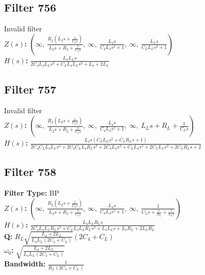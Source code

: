 \documentclass{article}
\begin{document}
\subsection*{Filter 756}
Invalid filter \\ 
\textbf{$Z(s)$:} $\left( \infty, \  \frac{R_{2} \left(L_{2} s + \frac{1}{C_{2} s}\right)}{L_{2} s + R_{2} + \frac{1}{C_{2} s}}, \  \infty, \  \frac{L_{4} s}{C_{4} L_{4} s^{2} + 1}, \  \infty, \  \frac{L_{L} s}{C_{L} L_{L} s^{2} + 1}\right)$ \\ 
\textbf{$H(s)$:} $\frac{L_{4} L_{L} s}{2 C_{4} L_{4} L_{L} s^{2} + C_{L} L_{4} L_{L} s^{2} + L_{4} + 2 L_{L}}$ \\ 
\subsection*{Filter 757}
Invalid filter \\ 
\textbf{$Z(s)$:} $\left( \infty, \  \frac{R_{2} \left(L_{2} s + \frac{1}{C_{2} s}\right)}{L_{2} s + R_{2} + \frac{1}{C_{2} s}}, \  \infty, \  \frac{L_{4} s}{C_{4} L_{4} s^{2} + 1}, \  \infty, \  L_{L} s + R_{L} + \frac{1}{C_{L} s}\right)$ \\ 
\textbf{$H(s)$:} $\frac{L_{4} s \left(C_{L} L_{L} s^{2} + C_{L} R_{L} s + 1\right)}{2 C_{4} C_{L} L_{4} L_{L} s^{4} + 2 C_{4} C_{L} L_{4} R_{L} s^{3} + 2 C_{4} L_{4} s^{2} + C_{L} L_{4} s^{2} + 2 C_{L} L_{L} s^{2} + 2 C_{L} R_{L} s + 2}$ \\ 
\subsection*{Filter 758}
\textbf{Filter Type:} BP \\ 
\textbf{$Z(s)$:} $\left( \infty, \  \frac{R_{2} \left(L_{2} s + \frac{1}{C_{2} s}\right)}{L_{2} s + R_{2} + \frac{1}{C_{2} s}}, \  \infty, \  \frac{L_{4} s}{C_{4} L_{4} s^{2} + 1}, \  \infty, \  \frac{1}{C_{L} s + \frac{1}{R_{L}} + \frac{1}{L_{L} s}}\right)$ \\ 
\textbf{$H(s)$:} $\frac{L_{4} L_{L} R_{L} s}{2 C_{4} L_{4} L_{L} R_{L} s^{2} + C_{L} L_{4} L_{L} R_{L} s^{2} + L_{4} L_{L} s + L_{4} R_{L} + 2 L_{L} R_{L}}$ \\ 
\textbf{Q:} $R_{L} \sqrt{\frac{L_{4} + 2 L_{L}}{L_{4} L_{L} \left(2 C_{4} + C_{L}\right)}} \left(2 C_{4} + C_{L}\right)$ \\ 
\textbf{$\omega_0$:} $\sqrt{\frac{L_{4} + 2 L_{L}}{L_{4} L_{L} \left(2 C_{4} + C_{L}\right)}}$ \\ 
\textbf{Bandwidth:} $\frac{1}{R_{L} \left(2 C_{4} + C_{L}\right)}$ \\ 
\end{document}
